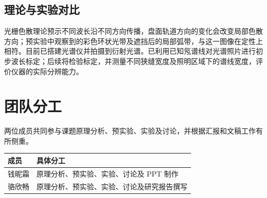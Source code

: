 \documentclass[UTF8,a4paper,12pt]{ctexart}
\begin{document}
\subsection{理论与实验对比}
光栅色散理论预示不同波长沿不同方向传播，盘面轨道方向的变化会改变局部色散方向；预实验中观察到的彩色环状光带及遮挡后的局部弧带，与这一图像在定性上相符。目前已搭建光谱仪并拍摄到衍射光谱。已利用已知氖谱线对光谱照片进行初步波长标定；后续将检验标定，并测量不同狭缝宽度及照明区域下的谱线宽度，评价仪器的实际分辨能力。

\section{团队分工}
两位成员共同参与课题原理分析、预实验、实验及讨论，并根据汇报和文稿工作有所侧重。
\begin{table}[H]
  \centering
  \begin{tabular}{p{}p{}}
    \toprule
    成员 & 具体分工 \\
    \midrule
    钱昵霜 & 原理分析、预实验、实验、讨论及 PPT 制作 \\
    骆欣畅 & 原理分析、预实验、实验、讨论及研究报告撰写 \\
    \bottomrule
  \end{tabular}
\end{table}
\end{document}
